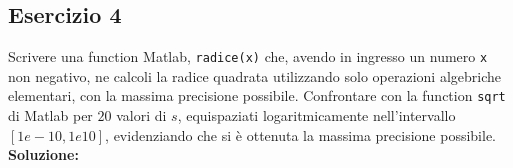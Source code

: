 \subsection{Esercizio 4}
Scrivere una function Matlab, \lstinline{radice(x)} che, avendo in ingresso un numero \lstinline{x}
non negativo, ne calcoli la radice quadrata utilizzando solo operazioni algebriche elementari, con
la massima precisione possibile. Confrontare con la function \lstinline{sqrt} di Matlab per $20$ valori di
$s$, equispaziati logaritmicamente nell'intervallo $[1e-10,1e10]$, evidenziando che si è ottenuta la
massima precisione possibile.
\newline \textbf{Soluzione:}


